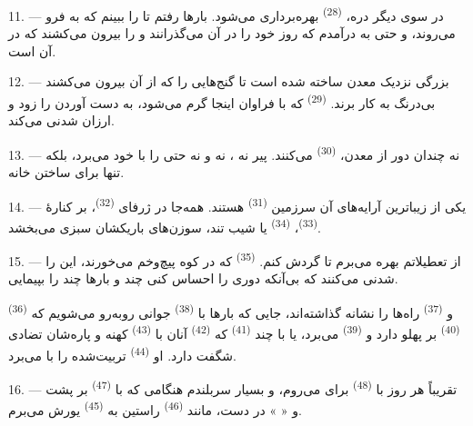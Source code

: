 11. --- در سوی دیگر دره،  \textsuperscript{(28)}
بهره‌برداری می‌شود. بارها رفتم تا  را ببینم که به
 فرو می‌روند، و حتی به  درآمدم که روز خود
را در آن می‌گذرانند و  را بیرون می‌کشند که
 در آن است.

12. ---  بزرگی نزدیک معدن ساخته شده است تا گنج‌هایی
را که از آن بیرون می‌کشند بی‌درنگ به کار برند. 
\textsuperscript{(29)} که با  فراوان اینجا گرم
می‌شود، به دست آوردن  را زود و ارزان شدنی می‌کند.

13. --- نه چندان دور از معدن،  \textsuperscript{(30)}
می‌کنند.  پیر نه ، نه 
و نه حتی  را با  خود می‌برد، بلکه تنها
 برای ساختن خانه.

14. --- یکی از زیباترین آرایه‌های آن سرزمین 
\textsuperscript{(31)} هستند. همه‌جا در ژرفای 
\textsuperscript{(32)}، بر کنارهٔ  \textsuperscript{(33)}،
 \textsuperscript{(34)} یا شیب تند، سوزن‌های باریکشان
سبزی می‌بخشد.

\VUsaut{3.0mm}
\VUsaut{3.0mm}

15. --- از تعطیلاتم بهره می‌برم تا  گردش کنم.
 \textsuperscript{(35)} که در کوه پیچ‌وخم می‌خورند،
این را شدنی می‌کنند که بی‌آنکه دوری را احساس کنی چند 
و بارها چند  را بپیمایی.

 \textsuperscript{(36)} و  \textsuperscript{(37)} راه‌ها را نشانه گذاشته‌اند، جایی که
بارها با  \textsuperscript{(38)} جوانی روبه‌رو
می‌شویم که  \textsuperscript{(40)} بر پهلو دارد و
 \textsuperscript{(39)} می‌برد، یا با چند
 \textsuperscript{(41)} که 
\textsuperscript{(42)} آنان با  \textsuperscript{(43)}
کهنه و پاره‌شان تضادی شگفت دارد. او 
\textsuperscript{(44)} تربیت‌شده را با  می‌برد.

\VUsaut{3.0mm}
\VUsaut{3.0mm}

16. --- تقریباً هر روز با  \textsuperscript{(48)} برای
 می‌روم، و بسیار سربلندم هنگامی که با 
\textsuperscript{(47)} بر پشت و «  » در دست،
مانند  \textsuperscript{(46)} راستین به 
\textsuperscript{(45)} یورش می‌برم.

